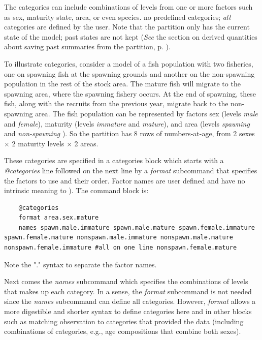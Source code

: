 The categories can include combinations of levels from one or more factors such as sex, maturity state, area, or even species. \CNAME\has no predefined categories; \emph{all} categories are defined by the user. Note that the partition only has the current state of the model; past states are not kept (\textit{See} the section on derived quantities about saving past summaries from the partition, p. \pageref{sec:derived-quantities}).

To illustrate categories, consider a model of a fish population with two fisheries, one on spawning fish at the spawning grounds and another on the non-spawning population in the rest of the stock area. The mature fish will migrate to the spawning area, where the spawning fishery occurs. At the end of spawning, these fish, along with the recruits from the previous year, migrate back to the non-spawning area. The fish population can be represented  by factors sex (levels \textit{male} and \textit{female}), maturity (levels \textit{immature} and \textit{mature}), and area (levels \textit{spawning} and \textit{non-spawning} ). So the partition has 8 rows of numbers-at-age, from 2 sexes $\times$ 2 maturity levels $\times$ 2 areas.

These categories are specified in a categories block which starts with a \textit{@categories} line followed on the next line by a \textit{format} subcommand that specifies the factors to use and their order. Factor names are user defined and have no intrinsic meaning to \CNAME). The command block is:

{\small{\begin{lstlisting}
	@categories
	format area.sex.mature
	names spawn.male.immature spawn.male.mature spawn.female.immature spawn.female.mature nonspawn.male.immature nonspawn.male.mature nonspawn.female.immature #all on one line nonspawn.female.mature  
\end{lstlisting}}}  %

Note the "." syntax to separate the factor names.

Next comes the \textit{names} subcommand which specifies the combinations of levels that makes up each category. In a sense, the \textit{format} subcommand is not needed since the \textit{names} subcommand can define all categories. However, \textit{format} allows a more  digestible and shorter syntax to define categories here and in other blocks such as matching observation to categories that provided the data (including combinations of categories, e.g., age compositions that combine both sexes).

